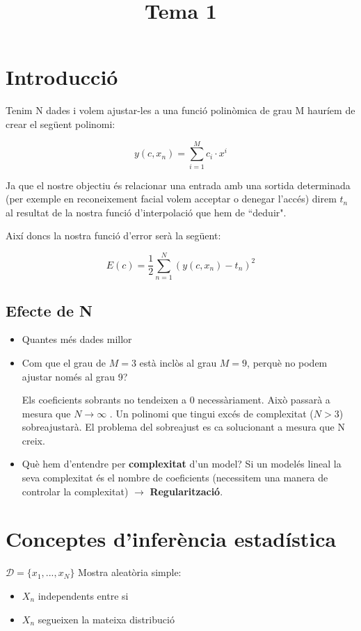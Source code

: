 \documentclass[a4paper]{article}
\begin{document}
	
\title{Tema 1}
\maketitle

\section{Introducció}

Tenim N dades i volem ajustar-les a una funció polinòmica de grau M hauríem de crear el següent polinomi:

\[ y(c, x_n) = \sum_{i=1}^{M} c_i·x^i \]

Ja que el nostre objectiu és relacionar una entrada amb una sortida determinada (per exemple en reconeixement facial volem acceptar o denegar l'accés) direm $t_n$ al resultat de la nostra funció d'interpolació que hem de ``deduir".

Així doncs la nostra funció d'error serà la següent:

\[ E(c) = \frac{1}{2} \sum_{n=1}^N (y(c, x_n) - t_n)^2 \]

\subsection{Efecte de N}

\begin{itemize}
	\item Quantes més dades millor
	\item Com que el grau de $M=3$ està inclòs al grau $M=9$, perquè no podem ajustar només al grau 9?
	
	Els coeficients sobrants no tendeixen a 0 necessàriament. Això passarà a mesura que $N \rightarrow \infty$ . Un polinomi que tingui excés de complexitat ($N > 3$) sobreajustarà. El problema del sobreajust es ca solucionant a mesura que N creix.
	\item Què hem d'entendre per \textbf{complexitat } d'un model? Si un modelés lineal la seva complexitat és el nombre de coeficients (necessitem una manera de controlar la complexitat) $\rightarrow$ \textbf{Regularització}.
\end{itemize}

\section{Conceptes d'inferència estadística}

$ \mathcal{D} = \{ x_1, ... , x_N \} $ Mostra aleatòria simple:
\begin{itemize}
	\item $X_n$ independents entre si
	\item $X_n$ segueixen la mateixa distribució
\end{itemize}
\end{document}
